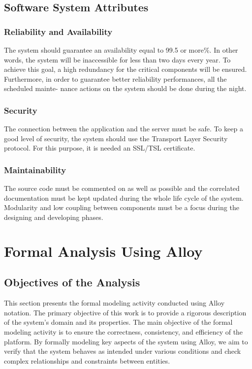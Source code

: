 \documentclass{article}
\begin{document}
\subsection{Software System Attributes}

\subsubsection{Reliability and Availability}
The system should guarantee an availability equal to 99.5 or more\%. In
other words, the system will be inaccessible for less than two days every year. To achieve this
goal, a high redundancy for the critical components will be ensured.
Furthermore, in order to guarantee better reliability performances, all the scheduled mainte-
nance actions on the system should be done during the night.
\subsubsection{Security}
The connection between the application and the server must be safe. To keep a good level of
security, the system should use the Transport Layer Security protocol. For this purpose, it is
needed an SSL/TSL certificate.
\subsubsection{Maintainability}
The source code must be commented on as well as possible and the correlated documentation
must be kept updated during the whole life cycle of the system.
Modularity and low coupling between components must be a focus during the designing and
developing phases.

\section{Formal Analysis Using Alloy}
\subsection{Objectives of the Analysis}
This section presents the formal modeling activity conducted using Alloy notation. The primary objective of this work is to provide a rigorous description of the system's domain and its properties.
The main objective of the formal modeling activity is to ensure the correctness, consistency, and efficiency of the platform. By formally modeling key aspects of the system using Alloy, we aim to verify that the system behaves as intended under various conditions and check complex relationships and constraints between entities.
\end{document}

